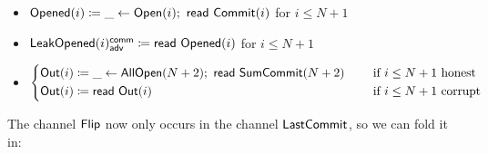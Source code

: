 \begin{itemize}
\item {\color{red} $\mathsf{Opened}(i) \coloneqq \_ \leftarrow \mathsf{Open}(i); \ \mathsf{read} \ \mathsf{Commit}(i)$ for $i \leq N+1$}
\item {\color{red} $\mathsf{LeakOpened}(i)^{\mathsf{comm}}_{\mathsf{adv}} \coloneqq \mathsf{read} \ \mathsf{Opened}(i)$ for $i \leq N+1$}
\item $\begin{cases*} \Out(i) \coloneqq \_ \leftarrow \AllOpen(N+2); \ \read{\SumCommit(N+2)} & \hspace{10pt} \text{if $i \leq N+1$ honest} \\ \Out(i) \coloneqq \read{\Out(i)} & \hspace{10pt} \text{if $i \leq N+1$ corrupt} \end{cases*}$
\end{itemize}

\noindent The channel $\mathsf{Flip}$ now only occurs in the channel $\mathsf{LastCommit}$, so we can fold it in:

